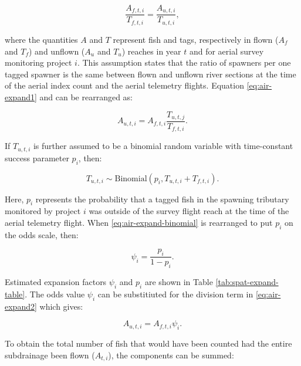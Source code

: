 \documentclass[12pt,]{book}
\theoremstyle{definition}
\theoremstyle{definition}
\theoremstyle{definition}
\theoremstyle{remark}
\begin{document}
\begin{equation}
  \frac{A_{f,t,i}}{T_{f,t,i}} = \frac{A_{u,t,i}}{T_{u,t,i}},
  \label{eq:air-expand1}
\end{equation}

\noindent
where the quantities \(A\) and \(T\) represent fish and tags,
respectively in flown (\(A_f\) and \(T_f\)) and unflown (\(A_u\) and
\(T_u\)) reaches in year \(t\) and for aerial survey monitoring project
\(i\). This assumption states that the ratio of spawners per one tagged
spawner is the same between flown and unflown river sections at the time
of the aerial index count and the aerial telemetry flights. Equation
\eqref{eq:air-expand1} and can be rearranged as:

\begin{equation}
  A_{u,t,i} = A_{f,t,i} \frac{T_{u,t,j}}{T_{f,t,i}}.
  \label{eq:air-expand2}
\end{equation}

\noindent
If \(T_{u,t,i}\) is further assumed to be a binomial random variable
with time-constant success parameter \(p_i\), then:

\begin{equation}
  T_{u,t,i} \sim \text{Binomial}(p_i,T_{u,t,i} + T_{f,t,i}).
  \label{eq:air-expand-binomial}
\end{equation}

\noindent
Here, \(p_i\) represents the probability that a tagged fish in the
spawning tributary monitored by project \(i\) was outside of the survey
flight reach at the time of the aerial telemetry flight. When
\eqref{eq:air-expand-binomial} is rearranged to put \(p_i\) on the odds
scale, then:

\begin{equation}
  \psi_i=\frac{p_i}{1-p_i}.
  \label{eq:air-expand-odds}
\end{equation}

\noindent
Estimated expansion factors \(\psi_i\) and \(p_i\) are shown in Table
\ref{tab:spat-expand-table}. The odds value \(\psi_i\) can be
substitiuted for the division term in \eqref{eq:air-expand2} which gives:

\begin{equation}
  A_{u,t,i} = A_{f,t,i} \psi_i.
  \label{eq:air-expand3}
\end{equation}

\noindent
To obtain the total number of fish that would have been counted had the
entire subdrainage been flown (\(\hat{A}_{t,i}\)), the components can be
summed:
\end{document}
